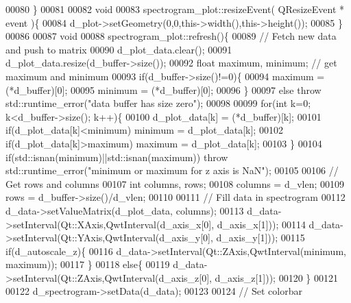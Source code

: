 \begin{DoxyCode}
00080         \}
00081         
00082         \textcolor{keywordtype}{void}
00083         spectrogram_plot::resizeEvent( QResizeEvent * event )\{
00084             d_plot->setGeometry(0,0,this->width(),this->height());
00085         \}
00086         
00087         \textcolor{keywordtype}{void}
00088         spectrogram_plot::refresh()\{
00089             \textcolor{comment}{// Fetch new data and push to matrix}
00090             d_plot_data.clear();
00091             d_plot_data.resize(d_buffer->size());
00092             \textcolor{keywordtype}{float} maximum, minimum; \textcolor{comment}{// get maximum and minimum}
00093             \textcolor{keywordflow}{if}(d_buffer->size()!=0)\{
00094                 maximum = (*d\_buffer)[0];
00095                 minimum = (*d\_buffer)[0];
00096             \}
00097             \textcolor{keywordflow}{else} \textcolor{keywordflow}{throw} std::runtime\_error(\textcolor{stringliteral}{"data buffer has size zero"});
00098             
00099             \textcolor{keywordflow}{for}(\textcolor{keywordtype}{int} k=0; k<d_buffer->size(); k++)\{
00100                 d_plot_data[k] = (*d\_buffer)[k];
00101                 \textcolor{keywordflow}{if}(d_plot_data[k]<minimum) minimum = d_plot_data[k];
00102                 \textcolor{keywordflow}{if}(d_plot_data[k]>maximum) maximum = d_plot_data[k];
00103             \}
00104             \textcolor{keywordflow}{if}(std::isnan(minimum)||std::isnan(maximum)) \textcolor{keywordflow}{throw} std::runtime\_error(\textcolor{stringliteral}{"minimum or maximum for z
       axis is NaN"});
00105             
00106             \textcolor{comment}{// Get rows and columns}
00107             \textcolor{keywordtype}{int} columns, rows;
00108             columns = d_vlen;
00109             rows = d_buffer->size()/d_vlen;
00110             
00111             \textcolor{comment}{// Fill data in spectrogram}
00112             d_data->setValueMatrix(d_plot_data, columns);
00113             d_data->setInterval(Qt::XAxis,QwtInterval(d_axis_x[0], d_axis_x[1]));
00114             d_data->setInterval(Qt::YAxis,QwtInterval(d_axis_y[0], d_axis_y[1]));
00115             \textcolor{keywordflow}{if}(d_autoscale_z)\{
00116                 d_data->setInterval(Qt::ZAxis,QwtInterval(minimum, maximum));
00117             \}
00118             \textcolor{keywordflow}{else}\{
00119                 d_data->setInterval(Qt::ZAxis,QwtInterval(d_axis_z[0], d_axis_z[1]));
00120             \}
00121             
00122             d_spectrogram->setData(d_data);
00123             
00124             \textcolor{comment}{// Set colorbar}

\end{DoxyCode}
